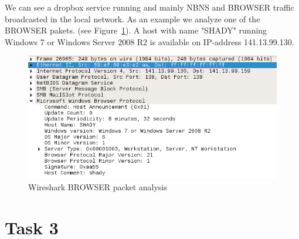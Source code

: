 \documentclass[12pt]{article}
\begin{document}

We can see a dropbox service running and mainly NBNS and BROWSER traffic broadcasted in the local network. As an example we analyze one of the BROWSER pakets. (see Figure~\ref{img_wireshark_browser}).
A host with name "SHADY" running Windows 7 or Windows Server 2008 R2 is available on IP-address 141.13.99.130.

\begin{figure}[h]%
\centering%
\includegraphics[width=\textwidth]{images/wireshark_browser.png}%
\caption{Wireshark BROWSER packet analysis}%
\label{img_wireshark_browser}%
\end{figure}%


\section{Task 3}\label{task3}
\end{document}
